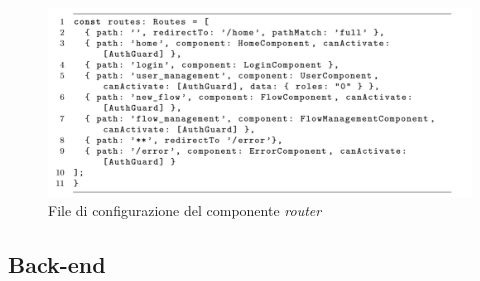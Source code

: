 \begin{figure}
\begin{center}
\includegraphics[width=1.0\columnwidth]{images/router.png}
\end{center}
\caption{File di configurazione del componente \textit{router}}
\label{fig:router}
\end{figure}









\subsection{Back-end}

